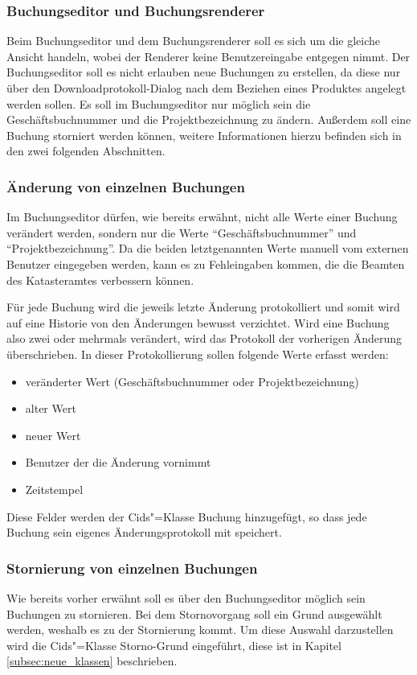 \subsubsection{Buchungseditor und Buchungsrenderer}
Beim Buchungseditor und dem Buchungsrenderer soll es sich um die gleiche Ansicht handeln, wobei der Renderer keine Benutzereingabe entgegen nimmt.
Der Buchungseditor soll es nicht erlauben neue Buchungen zu erstellen, da diese nur über den Downloadprotokoll-Dialog nach dem Beziehen eines Produktes angelegt werden sollen.
Es soll im Buchungseditor nur möglich sein die Geschäftsbuchnummer und die Projektbezeichnung zu ändern.
Außerdem soll eine Buchung storniert werden können, weitere Informationen hierzu befinden sich in den zwei folgenden Abschnitten.

\subsubsection{Änderung von einzelnen Buchungen} \label{subsubsec:aendern_buchung}
Im Buchungseditor dürfen, wie bereits erwähnt, nicht alle Werte einer Buchung verändert werden, sondern nur die Werte \enquote{Geschäftsbuchnummer} und \enquote{Projektbezeichnung}. Da die beiden letztgenannten Werte manuell vom externen Benutzer eingegeben werden, kann es zu Fehleingaben kommen, die die Beamten des Katasteramtes verbessern können.

Für jede Buchung wird die jeweils letzte Änderung protokolliert und somit wird auf eine Historie von den Änderungen bewusst verzichtet. Wird eine Buchung also zwei oder mehrmals verändert, wird das Protokoll der vorherigen Änderung überschrieben.
In dieser Protokollierung sollen folgende Werte erfasst werden:
\begin{itemize}
\item veränderter Wert (Geschäftsbuchnummer oder Projektbezeichnung)
\item alter Wert
\item neuer Wert
\item Benutzer der die Änderung vornimmt
\item Zeitstempel
\end{itemize}
Diese Felder werden der Cids"=Klasse Buchung hinzugefügt, so dass jede Buchung sein eigenes Änderungsprotokoll mit speichert.

\subsubsection{Stornierung von einzelnen Buchungen} \label{subsubsec:storno_buchung}
Wie bereits vorher erwähnt soll es über den Buchungseditor möglich sein Buchungen zu stornieren.
Bei dem Stornovorgang soll ein Grund ausgewählt werden, weshalb es zu der Stornierung kommt.
Um diese Auswahl darzustellen wird die Cids"=Klasse Storno-Grund eingeführt, diese ist in Kapitel \ref{subsec:neue_klassen} beschrieben.

